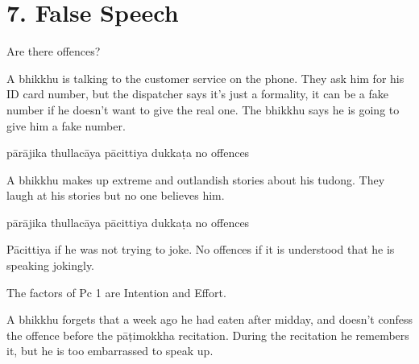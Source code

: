 \chapter{7. False Speech}
\renewcommand*{\theChapterTitle}{7. False Speech}

\begin{exam}{\autoExamName}

\begin{problem*}

Are there offences?

\begin{parts}

\item A bhikkhu is talking to the customer service on the phone. They ask him for
  his ID card number, but the dispatcher says it's just a formality, it can be a
  fake number if he doesn't want to give the real one. The bhikkhu says he is
  going to give him a fake number.

  \bigskip

  \begin{answers}{5}
    \bChoices
     pārājika\eAns
     thullacāya\eAns
     pācittiya\eAns
     dukkaṭa\eAns
     no offences\eAns
    \eChoices
  \end{answers}

  \bigskip

\item A bhikkhu makes up extreme and outlandish stories about his tudong. They
  laugh at his stories but no one believes him.

  \bigskip

  \begin{answers}{5}
    \bChoices
     pārājika\eAns
     thullacāya\eAns
     pācittiya\eAns
     dukkaṭa\eAns
     no offences\eAns
    \eChoices
  \end{answers}

  \begin{solution}
    Pācittiya if he was not trying to joke.
    No offences if it is understood that he is speaking jokingly.

    The factors of Pc 1 are Intention and Effort.
  \end{solution}

  \bigskip

\item A bhikkhu forgets that a week ago he had eaten after midday, and doesn't
  confess the offence before the pāṭimokkha recitation. During the recitation he
  remembers it, but he is too embarrassed to speak up.


\end{parts}
\end{problem*}
\end{exam}
